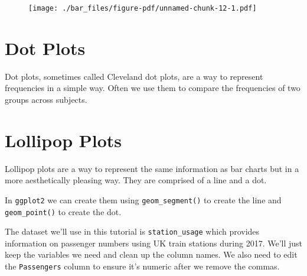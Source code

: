 \documentclass[
  letterpaper,
  DIV=11,
  numbers=noendperiod]{scrreprt}
\newenvironment{Shaded}{\begin{snugshade}}{\end{snugshade}}
\newcommand{\DecValTok}[1]{\textcolor[rgb]{0.68,0.00,0.00}{#1}}
\newcommand{\FunctionTok}[1]{\textcolor[rgb]{0.28,0.35,0.67}{#1}}
\newcommand{\NormalTok}[1]{\textcolor[rgb]{0.00,0.23,0.31}{#1}}
\newcommand{\OtherTok}[1]{\textcolor[rgb]{0.00,0.23,0.31}{#1}}
\newcommand{\SpecialCharTok}[1]{\textcolor[rgb]{0.37,0.37,0.37}{#1}}
\newcommand{\StringTok}[1]{\textcolor[rgb]{0.13,0.47,0.30}{#1}}
\begin{document}
\begin{figure}[H]

{\centering \texttt{[image: ./bar\_files/figure-pdf/unnamed-chunk-12-1.pdf]}

}

\end{figure}


\hypertarget{dot-plots}{%
\chapter{Dot Plots}\label{dot-plots}}

Dot plots, sometimes called Cleveland dot plots, are a way to represent
frequencies in a simple way. Often we use them to compare the
frequencies of two groups across subjects.


\hypertarget{lollipop-plots}{%
\chapter{Lollipop Plots}\label{lollipop-plots}}

Lollipop plots are a way to represent the same information as bar charts
but in a more aesthetically pleasing way. They are comprised of a line
and a dot.

In \texttt{ggplot2} we can create them using \texttt{geom\_segment()} to
create the line and \texttt{geom\_point()} to create the dot.

The dataset we'll use in this tutorial is \texttt{station\_usage} which
provides information on passenger numbers using UK train stations during
2017. We'll just keep the variables we need and clean up the column
names. We also need to edit the \texttt{Passengers} column to ensure
it's numeric after we remove the commas.

\begin{Shaded}
\end{Shaded}
\end{document}
